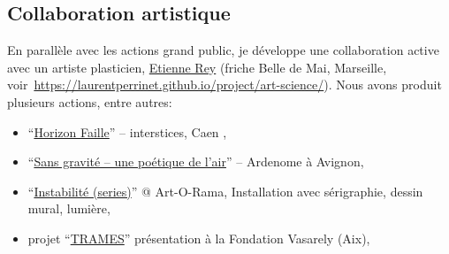 \documentclass[10pt,french,a4paper,oneside]{article}%
\newcommand{\years}[1]{\marginpar{\textit{\scriptsize #1}}}
\begin{document}
\begin{itemize}
\end{itemize}



\subsection{Collaboration artistique} %

En parallèle avec les actions grand public, je développe une collaboration active avec un artiste plasticien, \href{https://laurentperrinet.github.io/authors/etienne-rey/}{Etienne Rey} (friche Belle de Mai, Marseille, voir~\url{https://laurentperrinet.github.io/project/art-science/}). Nous avons produit plusieurs actions, entre autres:

\begin{itemize}
	\item ``\href{https://laurentperrinet.github.io/post/2021-10-04_interstices/}{Horizon Faille}'' – interstices, Caen \years{2021},
	\item ``\href{https://laurentperrinet.github.io/post/2019-06-22_ardemone/}{Sans gravité – une poétique de l’air}'' – Ardenome à Avignon\years{2019},
	\item ``\href{https://laurentperrinet.github.io/post/2018-09-09_artorama/}{Instabilité (series)}''\years{2018} @ Art-O-Rama, Installation avec sérigraphie, dessin mural, lumière,
	\item projet ``\href{https://laurentperrinet.github.io/post/2018-04-10_trames/}{TRAMES}'' présentation à la Fondation Vasarely (Aix)\years{2016},
\end{itemize}
\end{document}
